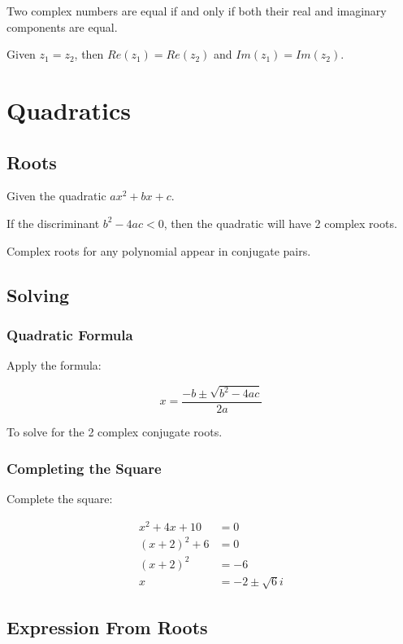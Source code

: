 \documentclass[a4paper,11pt]{article}
\begin{document}
Two complex numbers are equal if and only if both their real and imaginary
components are equal.

Given $z_1 = z_2$, then $Re(z_1) = Re(z_2)$ and $Im(z_1) = Im(z_2)$.




\section{Quadratics}

\subsection{Roots}

Given the quadratic $ax^2 + bx + c$.

If the discriminant $b^2 - 4ac < 0$, then the quadratic will have 2 complex
roots.

Complex roots for any polynomial appear in conjugate pairs.


\subsection{Solving}

\subsubsection{Quadratic Formula}

Apply the formula:

$$
x = \frac{-b \pm \sqrt{b^2 - 4ac}}{2a}
$$

To solve for the 2 complex conjugate roots.


\subsubsection{Completing the Square}

Complete the square:

$$
\begin{aligned}
x^2 + 4x + 10 & = 0 \\
(x + 2)^2 + 6 & = 0 \\
(x + 2)^2 & = -6 \\
x & = -2 \pm \sqrt{6}i
\end{aligned}
$$


\subsection{Expression From Roots}
\end{document}
